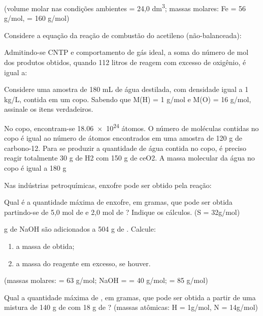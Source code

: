 \documentclass[a4paper,12]{exam}
\begin{document}
\begin{multicols}{2}
\begin{questions}
(volume molar nas condições ambientes = 24,0 \si{dm^3}; massas molares: Fe = 56 \si{g/mol},  = 160 \si{g/mol})

		\question Considere a equação da reação de combustão do acetileno (não-balanceada):
		\begin{center}
	 \end{center}
 
Admitindo-se CNTP e comportamento de gás ideal, a soma do número de mol dos produtos obtidos, quando 112 litros de  reagem com excesso de oxigênio, é igual a:
\makeemptybox{2cm}

		\question Considere uma amostra de 180 mL de água destilada, com densidade igual a 1 kg/L, contida em um copo. Sabendo que M(H) = 1 g/mol e M(O) = 16 g/mol, assinale os itens verdadeiros.
		\begin{checkboxes}
\choice No copo, encontram-se \num{18,06 e24} átomos.
\choice O número de moléculas contidas no copo é igual ao número de átomos encontrados em uma amostra de 120 g de carbono-12.
\choice Para se produzir a quantidade de água contida no copo, é preciso reagir totalmente 30 g de H2 com 150 g de ce{O2}.
\choice A massa molecular da água no copo é igual a 180 g
		\end{checkboxes}

		\question Nas indústrias petroquímicas, enxofre pode ser obtido pela reação:
\begin{center}
\end{center}
Qual é a quantidade máxima de enxofre, em gramas, que pode ser obtida partindo-se de 5,0 mol de  e 2,0 mol de ? Indique os cálculos. (S = 32\si{g/mol})
\makeemptybox{2cm}

 g de NaOH são adicionados a 504 g de
. Calcule:
\begin{enumerate}
\item a massa de  obtida;
\item a massa do reagente em excesso, se houver.
\end{enumerate}
(massas molares:  = 63 \si{g/mol}; NaOH =
= 40 \si{g/mol};  = 85 \si{g/mol})
\begin{center}
\end{center}
\makeemptybox{2cm}

\question Qual a quantidade máxima de , em gramas, que pode ser obtida a partir de uma mistura de 140 g de  com 18 g de ?
(massas atômicas: H = 1\si{g/mol}, N = 14\si{g/mol})
\begin{center}
\end{center}
\makeemptybox{2cm}


\end{questions}
\end{multicols}
\end{document}
